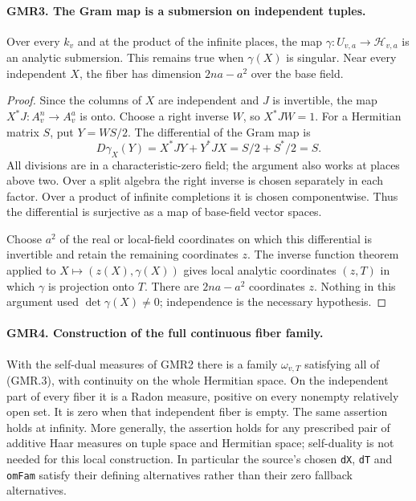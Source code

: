\documentclass[11pt,a4paper]{article}
\numberwithin{equation}{section}
\theoremstyle{remark}\newtheorem{remark}[theorem]{Remark}
\begin{document}

\paragraph{GMR3. The Gram map is a submersion on independent tuples.}
\label{claim:GMR3}
Over every $k_v$ and at the product of the infinite places, the map
$\gamma:U_{v,a}\to\mathcal H_{v,a}$ is an analytic submersion.
This remains true when $\gamma(X)$ is singular.  Near every independent
$X$, the fiber has dimension $2na-a^2$ over the base field.

\begin{proof}
Since the columns of $X$ are independent and $J$ is invertible, the
map $X^*J:A_v^n\to A_v^a$ is onto.  Choose a right inverse $W$, so
$X^*JW=1$.  For a Hermitian matrix $S$, put $Y=WS/2$.
The differential of the Gram map is
\[
 D\gamma_X(Y)=X^*JY+Y^*JX=S/2+S^*/2=S.
 \tag{GMR.8}
\]
All divisions are in a characteristic-zero field; the argument also
works at places above two.  Over a split algebra the right inverse
is chosen separately in each factor.  Over a product of infinite
completions it is chosen componentwise.  Thus the differential is
surjective as a map of base-field vector spaces.

Choose $a^2$ of the real or local-field coordinates on which this
differential is invertible and retain the remaining coordinates $z$.
The inverse function theorem applied to $X\mapsto(z(X),\gamma(X))$
gives local analytic coordinates $(z,T)$ in which $\gamma$ is projection
onto $T$.  There are $2na-a^2$ coordinates $z$.
Nothing in this argument used $\det\gamma(X)\ne0$; independence is the
necessary hypothesis.
\end{proof}

\paragraph{GMR4. Construction of the full continuous fiber family.}
\label{claim:GMR4}
With the self-dual measures of GMR2 there is a family
$\omega_{v,T}$ satisfying all of (GMR.3), with continuity on the whole
Hermitian space.  On the independent part of every fiber it is a Radon
measure, positive on every nonempty relatively open set.  It is zero
when that independent fiber is empty.  The same assertion holds at
infinity.  More generally, the assertion holds for any prescribed
pair of additive Haar measures on tuple space and Hermitian space;
self-duality is not needed for this local construction.
In particular the source's chosen \texttt{d\allowbreak X}, \texttt{d\allowbreak T}
and \texttt{om\allowbreak Fam} satisfy their defining alternatives rather than
their zero fallback alternatives.
\end{document}
